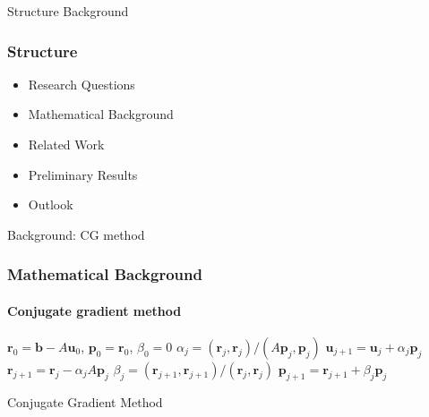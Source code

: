 \begin{frame}[label=background]{Structure Background}
    \frametitle{Structure}
    \begin{itemize}
        \item Research Questions
        \item {\color{tud grapefruit}Mathematical Background}
        \item Related Work
        \item Preliminary Results
        \item Outlook
    \end{itemize}
\end{frame}

\footerinfootnotestrue
\begin{frame}[label=background,fragile]{Background: CG method}
    \frametitle{Mathematical Background}
    \framesubtitle{Conjugate gradient method}
    \begin{algorithm}[H]
        \begin{algorithmic}
            \State $\mathbf{r}_0 = \mathbf{b} - A\mathbf{u}_0$, $\mathbf{p}_0 = \mathbf{r}_0$, $\beta_0 = 0$
            \State $\alpha_j = (\mathbf{r}_j, \mathbf{r}_j) / (A \mathbf{p}_j, \mathbf{p}_j)$
            \State $\mathbf{u}_{j+1} = \mathbf{u}_j + \alpha_j \mathbf{p}_j$
            \State $\mathbf{r}_{j+1} = \mathbf{r}_j - \alpha_j A \mathbf{p}_j$
            \State $\beta_j = (\mathbf{r}_{j+1}, \mathbf{r}_{j+1}) / (\mathbf{r}_j, \mathbf{r}_j)$
            \State $\mathbf{p}_{j+1} = \mathbf{r}_{j+1} + \beta_j \mathbf{p}_j$
            \EndFor
        \end{algorithmic}
        \caption{Conjugate Gradient Method \cite{iter_method_saad}}
    \end{algorithm}
\end{frame}

